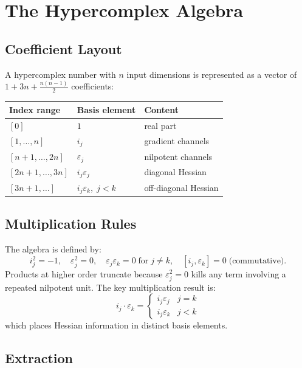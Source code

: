 \documentclass[11pt]{article}
\begin{document}
\section{The Hypercomplex Algebra}

\subsection{Coefficient Layout}

A hypercomplex number with $n$ input dimensions is represented as a vector of
$1 + 3n + \tfrac{n(n-1)}{2}$ coefficients:

\begin{center}
\begin{tabular}{lll}
\toprule
Index range & Basis element & Content \\
\midrule
$[0]$               & $1$             & real part \\
$[1, \ldots, n]$    & $i_j$           & gradient channels \\
$[n+1, \ldots, 2n]$ & $\varepsilon_j$ & nilpotent channels \\
$[2n+1, \ldots, 3n]$& $i_j\varepsilon_j$ & diagonal Hessian \\
$[3n+1, \ldots]$    & $i_j\varepsilon_k,\; j < k$ & off-diagonal Hessian \\
\bottomrule
\end{tabular}
\end{center}

\subsection{Multiplication Rules}

The algebra is defined by:
\[
  i_j^2 = -1, \quad \varepsilon_j^2 = 0, \quad \varepsilon_j\varepsilon_k = 0
  \;\text{for}\; j \neq k, \quad [i_j, \varepsilon_k] = 0 \;\text{(commutative)}.
\]
Products at higher order truncate because $\varepsilon_j^2 = 0$ kills any term
involving a repeated nilpotent unit. The key multiplication result is:
\[
  i_j \cdot \varepsilon_k =
  \begin{cases} i_j\varepsilon_j & j = k \\ i_j\varepsilon_k & j < k \end{cases}
\]
which places Hessian information in distinct basis elements.

\subsection{Extraction}
\end{document}
